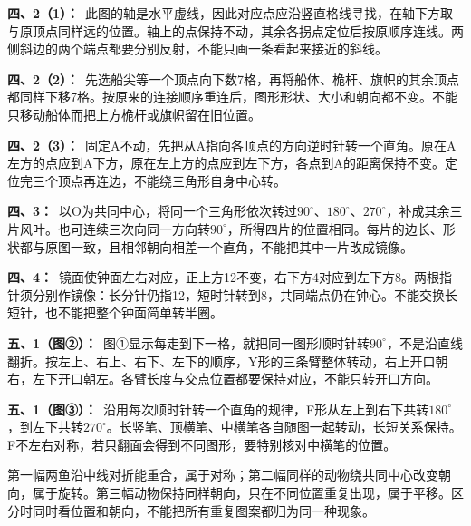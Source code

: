 \documentclass[multi=snippet,border=0pt]{standalone}
\newenvironment{snippet}[3]{\begin{minipage}{#1bp}\color{answerred}\fontsize{#2}{#3}\selectfont\raggedright}{\end{minipage}}
\begin{document}
\begin{snippet}{505}{11.5}{14}\textbf{四、2（1）：}\ 此图的轴是水平虚线，因此对应点应沿竖直格线寻找，在轴下方取与原顶点同样远的位置。轴上的点保持不动，其余各拐点定位后按原顺序连线。两侧斜边的两个端点都要分别反射，不能只画一条看起来接近的斜线。\end{snippet}
\begin{snippet}{505}{11.5}{14}\textbf{四、2（2）：}\ 先选船尖等一个顶点向下数7格，再将船体、桅杆、旗帜的其余顶点都同样下移7格。按原来的连接顺序重连后，图形形状、大小和朝向都不变。不能只移动船体而把上方桅杆或旗帜留在旧位置。\end{snippet}
\begin{snippet}{505}{11.5}{14}\textbf{四、2（3）：}\ 固定A不动，先把从A指向各顶点的方向逆时针转一个直角。原在A左方的点应到A下方，原在左上方的点应到左下方，各点到A的距离保持不变。定位完三个顶点再连边，不能绕三角形自身中心转。\end{snippet}
\begin{snippet}{505}{11.5}{14}\textbf{四、3：}\ 以O为共同中心，将同一个三角形依次转过\(90^\circ\)、\(180^\circ\)、\(270^\circ\)，补成其余三片风叶。也可连续三次向同一方向转\(90^\circ\)，所得四片的位置相同。每片的边长、形状都与原图一致，且相邻朝向相差一个直角，不能把其中一片改成镜像。\end{snippet}
\begin{snippet}{505}{11.5}{14}\textbf{四、4：}\ 镜面使钟面左右对应，正上方12不变，右下方4对应到左下方8。两根指针须分别作镜像：长分针仍指12，短时针转到8，共同端点仍在钟心。不能交换长短针，也不能把整个钟面简单转半圈。\end{snippet}
\begin{snippet}{505}{11.5}{14}\textbf{五、1（图②）：}\ 图①显示每走到下一格，就把同一图形顺时针转\(90^\circ\)，不是沿直线翻折。按左上、右上、右下、左下的顺序，Y形的三条臂整体转动，右上开口朝右，左下开口朝左。各臂长度与交点位置都要保持对应，不能只转开口方向。\end{snippet}
\begin{snippet}{505}{11.5}{14}\textbf{五、1（图③）：}\ 沿用每次顺时针转一个直角的规律，F形从左上到右下共转\(180^\circ\)，到左下共转\(270^\circ\)。长竖笔、顶横笔、中横笔各自随图一起转动，长短关系保持。F不左右对称，若只翻面会得到不同图形，要特别核对中横笔的位置。\end{snippet}
\begin{snippet}{505}{11.5}{14}第一幅两鱼沿中线对折能重合，属于对称；第二幅同样的动物绕共同中心改变朝向，属于旋转。第三幅动物保持同样朝向，只在不同位置重复出现，属于平移。区分时同时看位置和朝向，不能把所有重复图案都归为同一种现象。\end{snippet}
\end{document}
